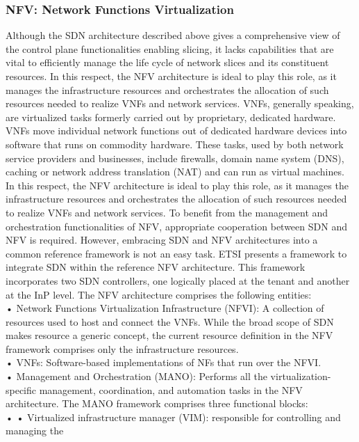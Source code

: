 \documentclass{article}
\begin{document}
\subsubsection{NFV: Network Functions Virtualization}
Although the SDN architecture described above
gives a comprehensive view of the control plane
functionalities enabling slicing, it lacks capabilities
that are vital to efficiently manage the life cycle of
network slices and its constituent resources. In this
respect, the NFV architecture is ideal to play
this role, as it manages the infrastructure resources
and orchestrates the allocation of such resources
needed to realize VNFs and network services. VNFs, generally speaking, are virtualized tasks formerly carried out by proprietary, dedicated hardware. VNFs move individual network functions out of dedicated hardware devices into software that runs on commodity hardware. These tasks, used by both network service providers and businesses, include firewalls, domain name system (DNS), caching or network address translation (NAT) and can run as virtual machines.\\
In this respect, the NFV architecture is ideal to play
this role, as it manages the infrastructure resources
and orchestrates the allocation of such resources
needed to realize VNFs and network services.
To benefit from the management and orchestration functionalities of NFV, appropriate cooperation between SDN and NFV is required.
However, embracing SDN and NFV architectures
into a common reference framework is not an
easy task. ETSI presents a framework
to integrate SDN within the reference NFV architecture. This framework incorporates two SDN
controllers, one logically placed at the tenant and
another at the InP level. The NFV architecture comprises the following
entities:\\
• Network Functions Virtualization Infrastructure (NFVI): A collection of resources used to
host and connect the VNFs. While the broad
scope of SDN makes resource a generic concept,
the current resource definition in the NFV framework comprises only the infrastructure resources.\\
• VNFs: Software-based implementations of NFs
that run over the NFVI.\\
• Management and Orchestration (MANO):
Performs all the virtualization-specific management, coordination, and automation tasks in the
NFV architecture. The MANO framework
comprises three functional blocks:\\
• • Virtualized infrastructure manager (VIM):
responsible for controlling and managing the
\end{document}
